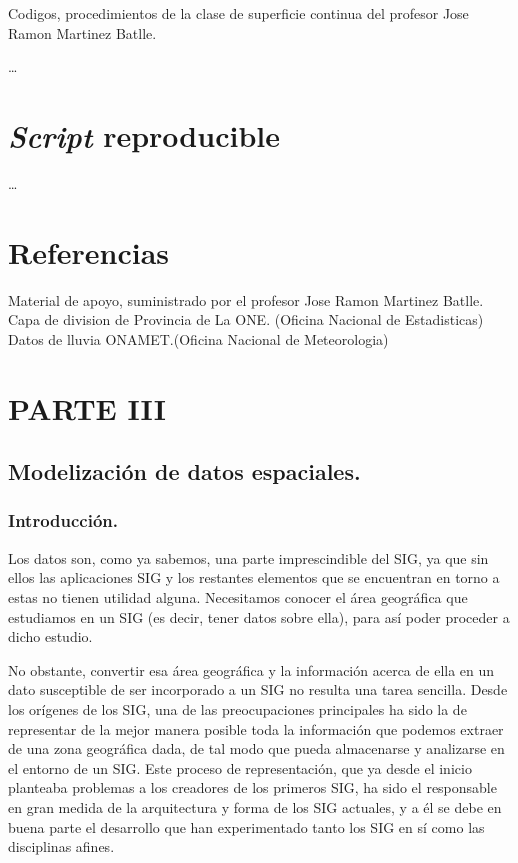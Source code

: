 \documentclass[11pt,]{article}
\begin{document}
Codigos, procedimientos de la clase de superficie continua del profesor
Jose Ramon Martinez Batlle.

\ldots

\section{\texorpdfstring{\emph{Script}
reproducible}{Script reproducible}}\label{script-reproducible-1}

\ldots

\section{Referencias}\label{referencias-1}

Material de apoyo, suministrado por el profesor Jose Ramon Martinez
Batlle. Capa de division de Provincia de La ONE. (Oficina Nacional de
Estadisticas) Datos de lluvia ONAMET.(Oficina Nacional de Meteorologia)

\section{PARTE III}\label{parte-iii}

\subsection{Modelización de datos
espaciales.}\label{modelizaciuxf3n-de-datos-espaciales.}

\subsubsection{Introducción.}\label{introducciuxf3n.-2}

Los datos son, como ya sabemos, una parte imprescindible del SIG, ya que
sin ellos las aplicaciones SIG y los restantes elementos que se
encuentran en torno a estas no tienen utilidad alguna. Necesitamos
conocer el área geográfica que estudiamos en un SIG (es decir, tener
datos sobre ella), para así poder proceder a dicho estudio.

No obstante, convertir esa área geográfica y la información acerca de
ella en un dato susceptible de ser incorporado a un SIG no resulta una
tarea sencilla. Desde los orígenes de los SIG, una de las preocupaciones
principales ha sido la de representar de la mejor manera posible toda la
información que podemos extraer de una zona geográfica dada, de tal modo
que pueda almacenarse y analizarse en el entorno de un SIG. Este proceso
de representación, que ya desde el inicio planteaba problemas a los
creadores de los primeros SIG, ha sido el responsable en gran medida de
la arquitectura y forma de los SIG actuales, y a él se debe en buena
parte el desarrollo que han experimentado tanto los SIG en sí como las
disciplinas afines.
\end{document}

